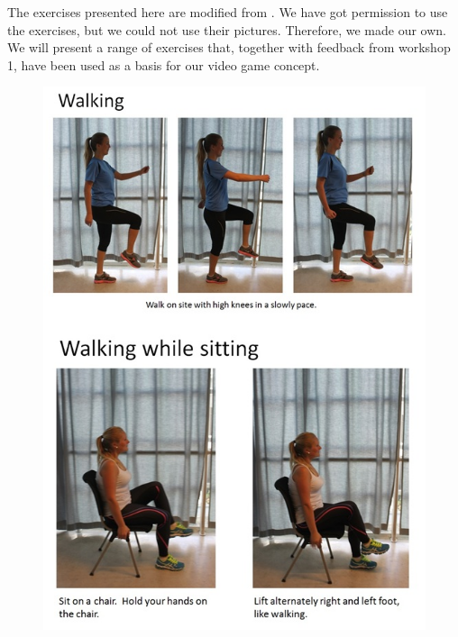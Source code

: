 The exercises presented here are modified from \cite{eldretrening}. We have got permission to use the exercises, but we could not use their pictures. Therefore, we made our own. We will present a range of exercises that, together with feedback from workshop 1, have been used as a basis for our video game concept.

\begin{figure} [H]
\centering
\includegraphics[scale=0.7]{Walking.jpg}
\label{app:walking}
\end{figure} 


